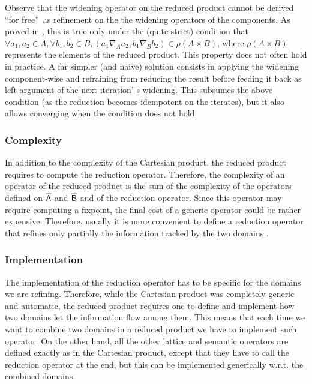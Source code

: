 \documentclass[submission,copyright,creativecommons]{eptcs}
\newcommand{\firstdomain}{\aset{A}}
\newcommand{\seconddomain}{\aset{B}}
\begin{document}
Observe that the widening operator on the reduced product cannot be derived \textquotedblleft for free\textquotedblright\ as refinement on the the widening operators of the components. As proved in \cite{ZanioliCortesi}, this is true only under the (quite strict) condition that $\forall a_1,a_2 \in A, \forall b_1,b_2 \in B, (a_1\nabla_A a_2, b_1 \nabla_B b_2)\in \rho(A \times B)$, where $\rho(A \times B)$ represents the elements of the reduced product.
This property does not often hold in practice. A far simpler (and naive) solution consists in applying the widening component-wise and refraining from reducing the result before feeding it back as left argument of the next iteration' s widening. This subsumes the above condition (as the reduction becomes idempotent on the iterates), but it also allows converging when the condition does not hold.



\subsubsection{Complexity}
In addition to the complexity of the Cartesian product, the reduced product requires to compute the reduction operator. Therefore, the complexity of an operator of the reduced product is the sum of the complexity of the operators defined on $\firstdomain$ and $\seconddomain$ and of the reduction operator. Since this operator may require computing a fixpoint, the final cost of a generic operator could be rather expensive. Therefore, usually it is more convenient to define a reduction operator that refines only partially the information tracked by the two domains \cite{LOG08}.


\subsubsection{Implementation}
The implementation of the reduction operator has to be specific for the domains we are refining. Therefore, while the Cartesian product was completely generic and automatic, the reduced product requires one to define and implement how two domains let the information flow among them. This means that each time we want to combine two domains in a reduced product we have to implement such operator. On the other hand, all the other lattice and semantic operators are defined exactly as in the Cartesian product, except that they have to call the reduction operator at the end, but this can be implemented generically w.r.t. the combined domains.
\end{document}
